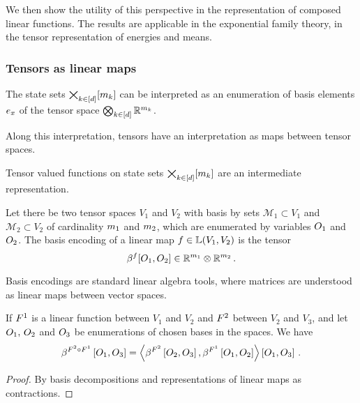 We then show the utility of this perspective in the representation of composed linear functions.
The results are applicable in the exponential family theory, in the tensor representation of energies and means.

\subsubsection{Tensors as linear maps}

The state sets $\bigtimes_{k\in[d]}[m_{k}]$ can be interpreted as an enumeration of basis elements $e_{x}$ of the tensor space $\bigotimes_{k\in[d]} \mathbb{R}^{m_{k}}$.

Along this interpretation, tensors have an interpretation as maps between tensor spaces.


Tensor valued functions on state sets $\bigtimes_{k\in[d]}[m_{k}]$ are an intermediate representation.

\begin{definition}
	Let there be two tensor spaces $V_1$ and $V_2$ with basis by sets $\mathcal{M}_1\subset V_1$ and $\mathcal{M}_2\subset V_2$ of cardinality $m_{1}$ and $m_{2}$, which are enumerated by variables $O_{1}$ and $O_{2}$.
	The basis encoding of a linear map $f\in\mathbb{L}(V_1,V_2)$ is the tensor
		\[ \beta^{f}[O_{1},O_{2}] \in \mathbb{R}^{m_{1}} \otimes \mathbb{R}^{m_{2}} \, . \] 
\end{definition}

Basis encodings are standard linear algebra tools, where matrices are understood as linear maps between vector spaces.

\begin{theorem}\label{the:linearCompositionBasisEncoding}
	If $F^{1}$ is a linear function between $V_1$ and $V_2$  and $F^{2}$ between $V_2$ and $V_3$, and let $O_{1},\,O_{2}$ and $O_{3}$ be enumerations of chosen bases in the spaces.
	We have
	\begin{align*}
		\beta^{F^{2}\circ F^{1}}\left[O_{1},O_{3}\right] 
		= \left\langle 
		\beta^{F^{2}}\left[O_{2},O_{3}\right], \beta^{F^{1}}\left[O_{1},O_{2}\right]
		\right\rangle \left[ O_{1},O_{3} \right]  \, . 
	\end{align*}
\end{theorem}
\begin{proof}
	By basis decompositions and representations of linear maps as contractions.
\end{proof}

